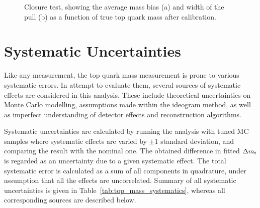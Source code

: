 \begin{figure}[!htp]
   \caption{Closure test, showing the average mass bias (a) and width of the pull (b) as a function of true top quark
            mass after calibration.
   \label{fig:calibrated_bias_pull_vs_mass}}
\end{figure}
 

\section{Systematic Uncertainties}
\label{s_top_mass:systematics}
Like any measurement, the top quark mass measurement is prone to various systematic errors. In attempt to evaluate them,
several sources of systematic effects are considered in this analysis. These include theoretical uncertainties on Monte
Carlo modelling, assumptions made within the ideogram method, as well as imperfect understanding of detector effects and
reconstruction algorithms.

Systematic uncertainties are calculated by running the analysis with tuned MC samples where systematic effects are
varied by $\pm 1$ standard deviation, and comparing the result with the nominal one. The obtained difference in fitted
$\Delta m_\mathrm{t}$ is regarded as an uncertainty due to a given systematic effect. The total systematic error is calculated
as a sum of all components in quadrature, under assumption that all the effects are uncorrelated. Summary of all
systematic uncertainties is given in Table~\ref{tab:top_mass_systematics}, whereas all corresponding sources are
described below.

